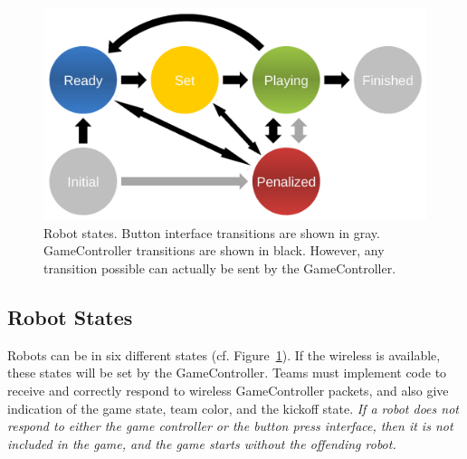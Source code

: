 \documentclass[12pt]{article}
\newcommand{\cf}{\mbox{cf.}\xspace}
\begin{document}
\begin{figure}[t]
\centerline{\includegraphics[width=0.9\columnwidth]{figs/states.pdf}}
\caption{Robot states. Button interface transitions are shown in gray. GameController transitions are shown in black. However, any transition possible can actually be sent by the GameController.}
\label{fig:robot_states}
\end{figure}

\subsection{Robot States}
\label{sec:robot_states}

Robots can be in six different states (\cf Figure~\ref{fig:robot_states}). If the wireless is available, these states will be set by the GameController. Teams must implement code to receive and correctly respond to wireless GameController packets, and also give indication of the game state, team color, and the kickoff state.
\emph{If a robot does not respond to either the game controller or the button press interface, then it is not included in the game, and the game starts without the offending robot.}
\end{document}
